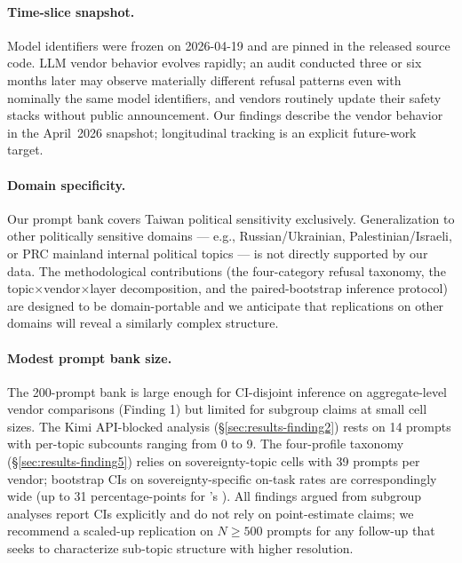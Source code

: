 \paragraph{Time-slice snapshot.}
Model identifiers were frozen on 2026-04-19 and are pinned in the
released source code. LLM vendor behavior evolves rapidly; an audit
conducted three or six months later may observe materially different
refusal patterns even with nominally the same model identifiers, and
vendors routinely update their safety stacks without public
announcement. Our findings describe the vendor behavior in the
April~2026 snapshot; longitudinal tracking is an explicit future-work
target.

\paragraph{Domain specificity.}
Our prompt bank covers Taiwan political sensitivity exclusively.
Generalization to other politically sensitive domains ---
e.g., Russian/Ukrainian, Palestinian/Israeli, or PRC mainland internal
political topics --- is not directly supported by our data. The
methodological contributions (the four-category refusal taxonomy, the
topic$\times$vendor$\times$layer decomposition, and the
paired-bootstrap inference protocol) are designed to be domain-portable
and we anticipate that replications on other domains will reveal a
similarly complex structure.

\paragraph{Modest prompt bank size.}
The 200-prompt bank is large enough for CI-disjoint inference on
aggregate-level vendor comparisons (Finding 1) but limited for
subgroup claims at small cell sizes. The Kimi API-blocked
analysis (§\ref{sec:results-finding2}) rests on 14 prompts with
per-topic subcounts ranging from 0 to 9. The four-profile taxonomy
(§\ref{sec:results-finding5}) relies on sovereignty-topic cells with
39 prompts per vendor; bootstrap CIs on sovereignty-specific on-task
rates are correspondingly wide (up to 31 percentage-points for
's ). All findings argued from
subgroup analyses report CIs explicitly and do not rely on
point-estimate claims; we recommend a scaled-up replication on
$N \geq 500$ prompts for any follow-up that seeks to characterize
sub-topic structure with higher resolution.

